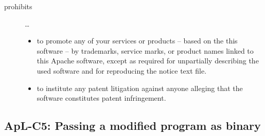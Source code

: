 \begin{description}
\item[prohibits] \ldots
\begin{itemize}
  \item to promote any of your services or products – based on the this software
  – by trademarks, service marks, or product names linked to this Apache
  software, except as required for unpartially describing the used software and
  for reproducing the notice text file.
  \item to institute any patent litigation against anyone alleging that the
  software constitutes patent infringement.
\end{itemize}

\end{description}

\subsection{ApL-C5: Passing a modified program as binary}
\label{OSUC-04B-Apache20}
